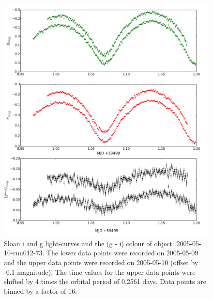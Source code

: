    \begin{figure}
     \center
     \includegraphics[width=120mm]{images/2005-05-10_updated.png} 
     \caption{Sloan i and g light-curves and the (g - i) colour of object: 2005-05-10-run012-73. The lower data points were recorded on 2005-05-09 and the upper data points were recorded on 2005-05-10 (offset by -0.1 magnitude). The time values for the upper data points were shifted by 4 times the orbital period of 0.2561 days. Data points are binned by a factor of 16. }
     \label{fig:2005-05-10-run012}
   \end{figure}

  
